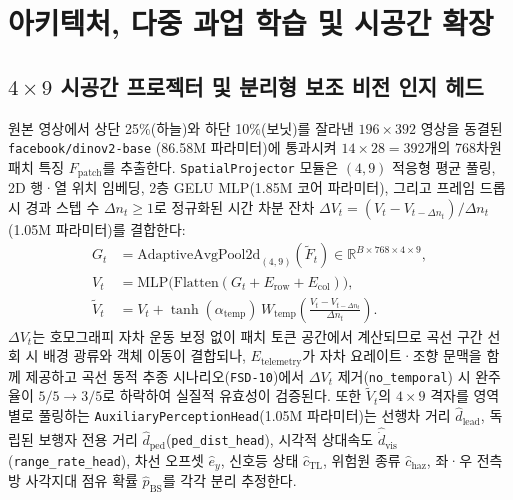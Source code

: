 \documentclass[10pt,twocolumn,a4paper]{article}
\begin{document}
\section{아키텍처, 다중 과업 학습 및 시공간 확장}

\subsection{\texorpdfstring{$4\times 9$}{4x9} 시공간 프로젝터 및 분리형 보조 비전 인지 헤드}
원본 영상에서 상단 25\%(하늘)와 하단 10\%(보닛)를 잘라낸 $196 \times 392$ 영상을 동결된 \texttt{facebook/dinov2-base} \cite{oquab2024dinov2}(86.58M 파라미터)에 통과시켜 $14 \times 28 = 392$개의 768차원 패치 특징 $F_{\text{patch}}$를 추출한다. \texttt{SpatialProjector} 모듈은 $(4, 9)$ 적응형 평균 풀링, 2D 행·열 위치 임베딩, 2층 GELU MLP(1.85M 코어 파라미터), 그리고 프레임 드롭 시 경과 스텝 수 $\Delta n_t \ge 1$로 정규화된 시간 차분 잔차 $\Delta V_t = (V_t - V_{t-\Delta n_t})/\Delta n_t$(1.05M 파라미터)를 결합한다:
\begin{align}
    G_t &= \text{AdaptiveAvgPool2d}_{(4,9)}(\tilde{F}_t) \in \mathbb{R}^{B \times 768 \times 4 \times 9}, \\
    V_t &= \text{MLP}\big(\text{Flatten}(G_t + E_{\text{row}} + E_{\text{col}})\big), \\
    \tilde{V}_t &= V_t + \tanh(\alpha_{\text{temp}})\, W_{\text{temp}}\!\left(\frac{V_t - V_{t-\Delta n_t}}{\Delta n_t}\right).
\end{align}
$\Delta V_t$는 호모그래피 자차 운동 보정 없이 패치 토큰 공간에서 계산되므로 곡선 구간 선회 시 배경 광류와 객체 이동이 결합되나, $E_{\text{telemetry}}$가 자차 요레이트·조향 문맥을 함께 제공하고 곡선 동적 추종 시나리오(\texttt{FSD-10})에서 $\Delta V_t$ 제거(\texttt{no\_temporal}) 시 완주율이 $5/5 \to 3/5$로 하락하여 실질적 유효성이 검증된다. 또한 $\tilde{V}_t$의 $4 \times 9$ 격자를 영역별로 풀링하는 \texttt{AuxiliaryPerceptionHead}(1.05M 파라미터)는 선행차 거리 $\hat{d}_{\text{lead}}$, 독립된 보행자 전용 거리 $\hat{d}_{\text{ped}}$(\texttt{ped\_dist\_head}), 시각적 상대속도 $\hat{\dot{d}}_{\text{vis}}$(\texttt{range\_rate\_head}), 차선 오프셋 $\hat{e}_y$, 신호등 상태 $\hat{c}_{\text{TL}}$, 위험원 종류 $\hat{c}_{\text{haz}}$, 좌·우 전측방 사각지대 점유 확률 $\hat{p}_{\text{BS}}$를 각각 분리 추정한다.
\end{document}
